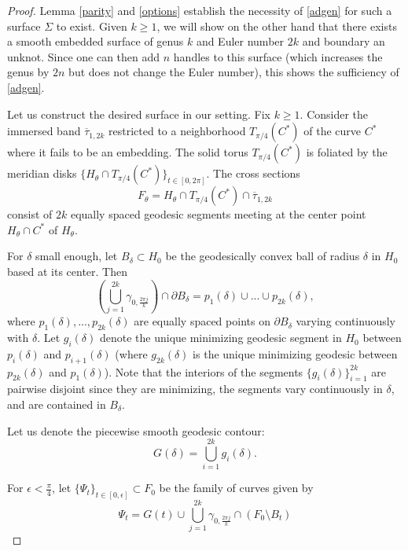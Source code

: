 \documentclass[10pt,a4paper]{amsart}
\numberwithin{equation}{section}
\begin{document}
\begin{proof}
Lemma \ref{parity} and \eqref{options} establish the necessity of \eqref{adgen} for such a surface $\Sigma$ to exist.  Given $k\geq 1$, we will show on the other hand that there exists a smooth embedded surface of genus $k$ and Euler number $2k$ and boundary an unknot.  Since one can then add $n$ handles to this surface (which increases the genus by $2n$ but does not change the Euler number), this shows the sufficiency of \eqref{adgen}.

Let us construct the desired surface in our setting.  Fix $k\geq 1$. Consider the immersed band $\overline{\tau}_{1,2k}$ restricted to a neighborhood $T_{\pi/4}(C^*)$ of the curve $C^*$ where it fails to be an embedding.  The solid torus $T_{\pi/4}(C^*)$ is foliated by the meridian disks $\{H_\theta\cap  T_{\pi/4}(C^*)\}_{t\in [0,2\pi]}$.  The cross sections \begin{equation}F_\theta = H_\theta\cap T_{\pi/4}(C^*)\cap \overline{\tau}_{1,2k}\end{equation} consist of $2k$ equally spaced geodesic segments meeting at the center point $H_\theta\cap C^*$ of $H_\theta$.  

For $\delta$ small enough, let $B_\delta\subset H_0$ be the geodesically convex ball of radius $\delta$ in $H_0$ based at its center.  Then 
\begin{equation}
(\bigcup_{j=1}^{2k} \gamma_{0,\frac{2\pi j}{k}})\cap \partial B_\delta = p_1(\delta)\cup...\cup p_{2k}(\delta), 
\end{equation}
where $p_1(\delta),...,p_{2k}(\delta)$ are equally spaced points on $\partial B_\delta$ varying continuously with $\delta$.
Let $g_i(\delta)$ denote the unique minimizing geodesic segment in $H_0$ between $p_i(\delta)$ and $p_{i+1}(\delta)$ (where $g_{2k}(\delta)$ is the unique minimizing geodesic between $p_{2k}(\delta)$ and $p_1(\delta)$).  Note that the interiors of the segments $\{g_i(\delta)\}_{i=1}^{2k}$ are pairwise disjoint since they are minimizing, the segments vary continuously in $\delta$, and are contained in $B_\delta$.

Let us denote the piecewise smooth geodesic contour:
\begin{equation}
G(\delta) = \bigcup_{i=1}^{2k} g_i(\delta).
\end{equation}


For $\epsilon<\frac{\pi}{4}$, let  $\{\Psi_t\}_{t\in [0,\epsilon]}\subset F_0$ be the family of curves given by 
\begin{equation}
\Psi_t = G(t)\cup \bigcup_{j=1}^{2k} \gamma_{0,\frac{2\pi j}{k}}\cap (F_0\setminus B_t) 
\end{equation}


\end{proof}
\end{document}
